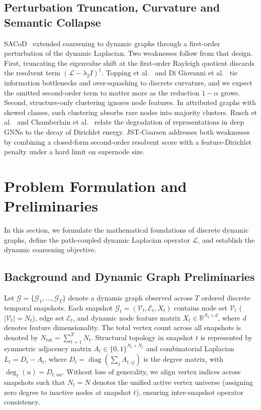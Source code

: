 \documentclass[sigconf]{acmart}
\begin{document}
\subsection{Perturbation Truncation, Curvature and Semantic Collapse}
SACoD~\cite{sacod2026} extended coarsening to dynamic graphs through a first-order perturbation of the dynamic Laplacian. Two weaknesses follow from that design. First, truncating the eigenvalue shift at the first-order Rayleigh quotient discards the resolvent term $(\mathcal{L} - \lambda_2 I)^\dagger$. Topping et al.~\cite{topping2022understanding} and Di Giovanni et al.~\cite{digiovanni2023oversquashing} tie information bottlenecks and over-squashing to discrete curvature, and we expect the omitted second-order term to matter more as the reduction $1 - \alpha$ grows. Second, structure-only clustering ignores node features. In attributed graphs with skewed classes, such clustering absorbs rare nodes into majority clusters. Rusch et al.~\cite{rusch2023survey} and Chamberlain et al.~\cite{chamberlain2021grand} relate the degradation of representations in deep GNNs to the decay of Dirichlet energy. JST-Coarsen addresses both weaknesses by combining a closed-form second-order resolvent score with a feature-Dirichlet penalty under a hard limit on supernode size.

\section{Problem Formulation and Preliminaries}
\label{sec:formulation}
In this section, we formulate the mathematical foundations of discrete dynamic graphs, define the path-coupled dynamic Laplacian operator $\mathcal{L}$, and establish the dynamic coarsening objective.

\subsection{Background and Dynamic Graph Preliminaries}
Let $\mathcal{G} = \{\mathcal{G}_1, \dots, \mathcal{G}_T\}$ denote a dynamic graph observed across $T$ ordered discrete temporal snapshots. Each snapshot $\mathcal{G}_t = (\mathcal{V}_t, \mathcal{E}_t, X_t)$ contains node set $\mathcal{V}_t$ ($|\mathcal{V}_t| = N_t$), edge set $\mathcal{E}_t$, and dynamic node feature matrix $X_t \in \mathbb{R}^{N_t \times d}$, where $d$ denotes feature dimensionality. The total vertex count across all snapshots is denoted by $N_{\text{tot}} = \sum_{t=1}^T N_t$.
Structural topology in snapshot $t$ is represented by symmetric adjacency matrix $A_t \in \{0, 1\}^{N_t \times N_t}$ and combinatorial Laplacian $L_t = D_t - A_t$, where $D_t = \operatorname{diag}(\sum_{j} A_{t, ij})$ is the degree matrix, with $\operatorname{deg}_t(u) = D_{t, uu}$. Without loss of generality, we align vertex indices across snapshots such that $N_t = N$ denotes the unified active vertex universe (assigning zero degree to inactive nodes at snapshot $t$), ensuring inter-snapshot operator consistency.
\end{document}
